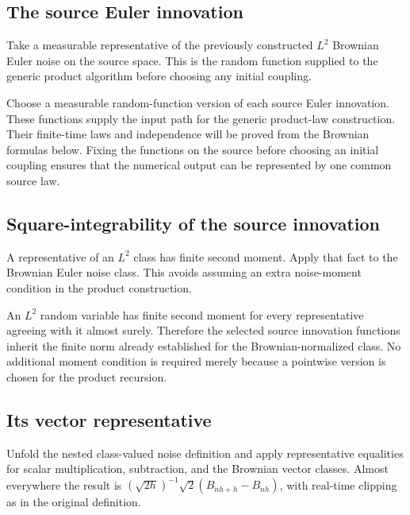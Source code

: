 \documentclass[11pt,a4paper]{report}
\begin{document}
\subsection{\texorpdfstring{The source Euler innovation}{The source Euler innovation}}
\label{report-step-UnadjustedLangevin-ProductBrownian-lean-4}


Take a measurable representative of the previously constructed \(L^2\) Brownian Euler noise on the source space. This is the random function supplied to the generic product algorithm before choosing any initial coupling.



Choose a measurable random-function version of each source Euler innovation. These functions supply the input path for the generic product-law construction. Their finite-time laws and independence will be proved from the Brownian formulas below. Fixing the functions on the source before choosing an initial coupling ensures that the numerical output can be represented by one common source law.

\subsection{\texorpdfstring{Square-integrability of the source innovation}{Square-integrability of the source innovation}}
\label{report-step-UnadjustedLangevin-ProductBrownian-lean-5}


A representative of an \(L^2\) class has finite second moment. Apply that fact to the Brownian Euler noise class. This avoids assuming an extra noise-moment condition in the product construction.



An \(L^2\) random variable has finite second moment for every representative agreeing with it almost surely. Therefore the selected source innovation functions inherit the finite norm already established for the Brownian-normalized class. No additional moment condition is required merely because a pointwise version is chosen for the product recursion.

\subsection{\texorpdfstring{Its vector representative}{Its vector representative}}
\label{report-step-UnadjustedLangevin-ProductBrownian-lean-6}


Unfold the nested class-valued noise definition and apply representative equalities for scalar multiplication, subtraction, and the Brownian vector classes. Almost everywhere the result is \((\sqrt{2h})^{-1}\sqrt2(B_{nh+h}-B_{nh})\), with real-time clipping as in the original definition.
\end{document}
